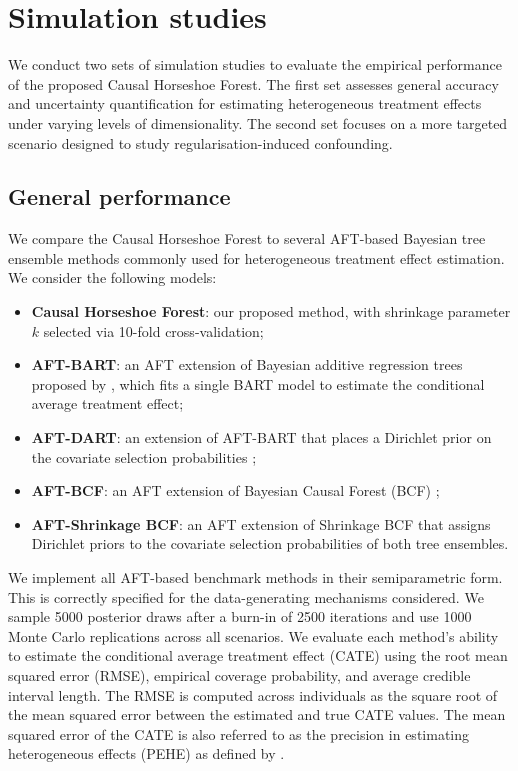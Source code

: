 \section{Simulation studies}\label{section:Simulations}

We conduct two sets of simulation studies to evaluate the empirical performance of the proposed Causal Horseshoe Forest. 
The first set assesses general accuracy and uncertainty quantification for estimating heterogeneous treatment effects under varying levels of dimensionality.
The second set focuses on a more targeted scenario designed to study regularisation-induced confounding.

\subsection{General performance}\label{sec:sim-setup}

We compare the Causal Horseshoe Forest to several AFT-based Bayesian tree ensemble methods commonly used for heterogeneous treatment effect estimation.
We consider the following models:
{\setlength{\itemsep}{1pt}
 \setlength{\parsep}{0pt}
\begin{itemize}
    \item \textbf{Causal Horseshoe Forest}: our proposed method, with shrinkage parameter $k$ selected via 10-fold cross-validation;
    \item \textbf{AFT-BART}: an AFT extension of Bayesian additive regression trees proposed by \citet{henderson2020individualized}, which fits a single BART model to estimate the conditional average treatment effect;
    \item \textbf{AFT-DART}: an extension of AFT-BART that places a Dirichlet prior on the covariate selection probabilities \citep{linero2018dirichlet};
    \item \textbf{AFT-BCF}: an AFT extension of Bayesian Causal Forest (BCF) \citep{hahn2020bayesian};
    \item \textbf{AFT-Shrinkage BCF}: an AFT extension of Shrinkage BCF \citep{caron2022shrinkage} that assigns Dirichlet priors to the covariate selection probabilities of both tree ensembles.
\end{itemize}
} 
We implement all AFT-based benchmark methods in their semiparametric form. 
This is correctly specified for the data-generating mechanisms considered. 
We sample 5000 posterior draws after a burn-in of 2500 iterations and use 1000 Monte Carlo replications across all scenarios.
We evaluate each method’s ability to estimate the conditional average treatment effect (CATE) using the root mean squared error (RMSE), empirical coverage probability, and average credible interval length. 
The RMSE is computed across individuals as the square root of the mean squared error between the estimated and true CATE values.
The mean squared error of the CATE is also referred to as the precision in estimating heterogeneous effects (PEHE) as defined by \citet{Hill2011}.


